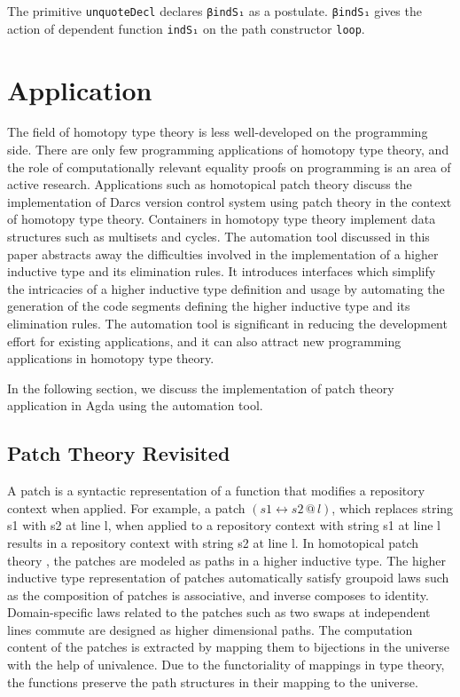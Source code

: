 \documentclass[sigplan,10pt]{acmart}
\begin{document}
The primitive {\tt unquoteDecl} declares {\tt βindS₁} as a postulate. {\tt βindS₁} gives the action of dependent function {\tt indS₁} on the path constructor {\tt loop}.

\section{Application}
The field of homotopy type theory is less well-developed on the programming side. There are only few programming applications of homotopy type theory, and the role of computationally relevant equality proofs on programming is an area of active research. Applications such as homotopical patch theory \cite{Angiuli-2014} discuss the implementation of Darcs \cite{Darcs-2005} version control system using patch theory \cite{Mimram-2013} \cite{Jason-2009} in the context of homotopy type theory. Containers in homotopy type theory \cite{Altenkirch-2014} \cite{Abbott-2005} implement data structures such as multisets and cycles. The automation tool discussed in this paper abstracts away the difficulties involved in the implementation of a higher inductive type and its elimination rules. It introduces interfaces which simplify the intricacies of a higher inductive type definition and usage by automating the generation of the code segments defining the higher inductive type and its elimination rules. The automation tool is significant in reducing the development effort for existing applications, and it can also attract new programming applications in homotopy type theory.

In the following section, we discuss the implementation of patch theory application in Agda using the automation tool.

\subsection{Patch Theory Revisited}
A patch is a syntactic representation of a function that modifies a repository context when applied. For example, a patch $(s1 \leftrightarrow s2 \, @ \, l)$, which replaces string s1 with s2 at line l, when applied to a repository context with string s1 at line l results in a repository context with string s2 at line l. In homotopical patch theory \cite{Angiuli-2014}, the patches are modeled as paths in a higher inductive type. The higher inductive type representation of patches automatically satisfy groupoid laws such as the composition of patches is associative, and inverse composes to identity. Domain-specific laws related to the patches such as two swaps at independent lines commute are designed as higher dimensional paths. The computation content of the patches is extracted by mapping them to bijections in the universe with the help of univalence. Due to the functoriality of mappings in type theory, the functions preserve the path structures in their mapping to the universe.
\end{document}
